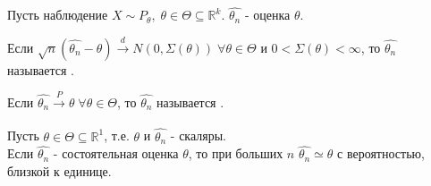Пусть наблюдение $X \sim P_{\theta}, \; \theta \in \Theta \subseteq \mathbb{R}^k$. $\hat{\theta_n}$ - оценка $\theta$.

\begin{definition}\label{lec:1/def:4}
	Если $\sqrt{n} (\hat{\theta_n} - \theta) \xrightarrow[]{d} N(0, \Sigma (\theta)) \; \forall \theta \in \Theta$ и $0 < \Sigma (\theta) < \infty$, то $\hat{\theta_n}$ называется .
\end{definition}

\begin{definition}\label{lec:1/def:5}
	Если $\hat{\theta_n} \xrightarrow[]{P} \theta \; \forall \theta \in \Theta$, то $\hat{\theta_n}$ называется .
\end{definition}

Пусть $\theta \in \Theta \subseteq \mathbb{R}^1$, т.е. $\theta$ и $\hat{\theta_n}$ - скаляры.\\

Если $\hat{\theta_n}$ - состоятельная оценка $\theta$, то при больших $n$ $\hat{\theta_n} \simeq \theta$ с вероятностью, близкой к единице.\\

